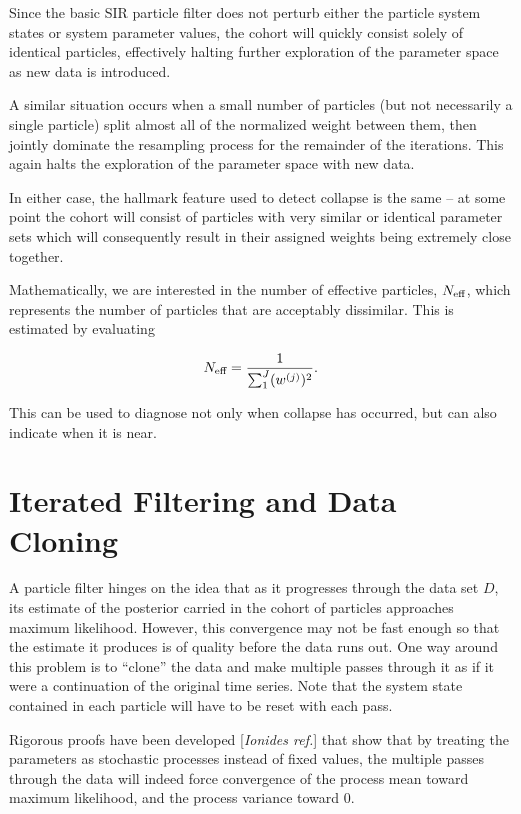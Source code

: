 	Since the basic SIR particle filter does not perturb either the particle system states or system parameter values, the cohort will quickly consist solely of identical particles, effectively halting further exploration of the parameter space as new data is introduced.

	A similar situation occurs when a small number of particles (but not necessarily a single particle) split almost all of the normalized weight between them, then jointly dominate the resampling process for the remainder of the iterations. This again halts the exploration of the parameter space with new data.

	In either case, the hallmark feature used to detect collapse is the same -- at some point the cohort will consist of particles with very similar or identical parameter sets which will consequently result in their assigned weights being extremely close together.

	Mathematically, we are interested in the number of effective particles, $N_{\small\text{eff}}$, which represents the number of particles that are acceptably dissimilar. This is estimated by evaluating

	\begin{equation}
		N_{\small\text{eff}} = \frac{1}{\sum_1^J (w^{(j)})^2}.
	\end{equation}

	This can be used to diagnose not only when collapse has occurred, but can also indicate when it is near.


\section{Iterated Filtering and Data Cloning}

	A particle filter hinges on the idea that as it progresses through the data set $D$, its estimate of the posterior carried in the cohort of particles approaches maximum likelihood. However, this convergence may not be fast enough so that the estimate it produces is of quality before the data runs out. One way around this problem is to ``clone'' the data and make multiple passes through it as if it were a continuation of the original time series. Note that the system state contained in each particle will have to be reset with each pass.

	Rigorous proofs have been developed [\textit{Ionides ref.}] that show that by treating the parameters as stochastic processes instead of fixed values, the multiple passes through the data will indeed force convergence of the process mean toward maximum likelihood, and the process variance toward 0.


